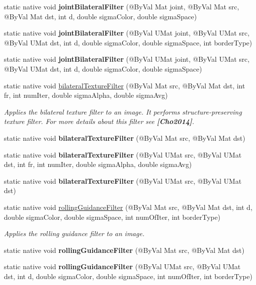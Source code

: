 \begin{DoxyCompactItemize}
static native void {\bfseries joint\+Bilateral\+Filter} (@By\+Val Mat joint, @By\+Val Mat src, @By\+Val Mat dst, int d, double sigma\+Color, double sigma\+Space)
\item 
static native void {\bfseries joint\+Bilateral\+Filter} (@By\+Val U\+Mat joint, @By\+Val U\+Mat src, @By\+Val U\+Mat dst, int d, double sigma\+Color, double sigma\+Space, int border\+Type)
\item 
static native void {\bfseries joint\+Bilateral\+Filter} (@By\+Val U\+Mat joint, @By\+Val U\+Mat src, @By\+Val U\+Mat dst, int d, double sigma\+Color, double sigma\+Space)
\item 
static native void \hyperlink{group__ximgproc__filters_ga369c99e9a5e13c93042c670509e04dfc}{bilateral\+Texture\+Filter} (@By\+Val Mat src, @By\+Val Mat dst, int fr, int num\+Iter, double sigma\+Alpha, double sigma\+Avg)
\begin{DoxyCompactList}\small\item\em Applies the bilateral texture filter to an image. It performs structure-\/preserving texture filter. For more details about this filter see {\bfseries [Cho2014]}. \end{DoxyCompactList}\item 
static native void {\bfseries bilateral\+Texture\+Filter} (@By\+Val Mat src, @By\+Val Mat dst)
\item 
static native void {\bfseries bilateral\+Texture\+Filter} (@By\+Val U\+Mat src, @By\+Val U\+Mat dst, int fr, int num\+Iter, double sigma\+Alpha, double sigma\+Avg)
\item 
static native void {\bfseries bilateral\+Texture\+Filter} (@By\+Val U\+Mat src, @By\+Val U\+Mat dst)
\item 
static native void \hyperlink{group__ximgproc__filters_ga2ce496356d7b8cd485c04de402fdb8f5}{rolling\+Guidance\+Filter} (@By\+Val Mat src, @By\+Val Mat dst, int d, double sigma\+Color, double sigma\+Space, int num\+Of\+Iter, int border\+Type)
\begin{DoxyCompactList}\small\item\em Applies the rolling guidance filter to an image. \end{DoxyCompactList}\item 
static native void {\bfseries rolling\+Guidance\+Filter} (@By\+Val Mat src, @By\+Val Mat dst)
\item 
static native void {\bfseries rolling\+Guidance\+Filter} (@By\+Val U\+Mat src, @By\+Val U\+Mat dst, int d, double sigma\+Color, double sigma\+Space, int num\+Of\+Iter, int border\+Type)

\end{DoxyCompactItemize}
